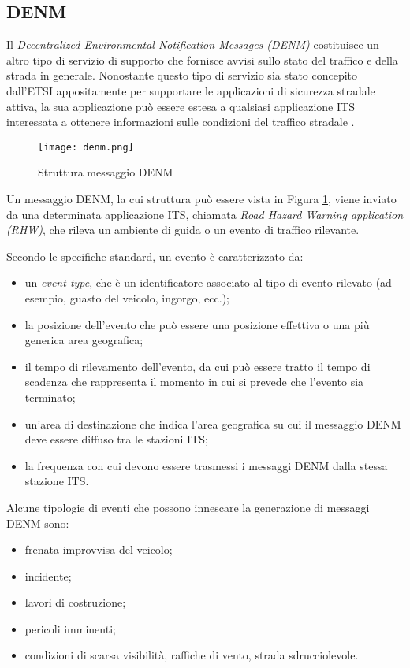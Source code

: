\subsection[DENM]{DENM}
Il \textit{Decentralized Environmental Notification Messages (DENM)} costituisce un altro tipo di servizio di supporto che fornisce avvisi sullo stato del traffico e della strada in generale. Nonostante questo tipo di servizio sia stato concepito dall'ETSI appositamente per supportare le applicazioni di sicurezza stradale attiva, la sua applicazione può essere estesa a qualsiasi applicazione ITS interessata a ottenere informazioni sulle condizioni del traffico stradale \cite{etsi2010etsi}.

\begin{figure}[h!]
    \centering
    \texttt{[image: denm.png]}
    \caption{Struttura messaggio DENM}
    \label{fig:denm}
\end{figure}

Un messaggio DENM, la cui struttura può essere vista in Figura \ref{fig:denm}, viene inviato da una determinata applicazione ITS, chiamata \textit{Road Hazard Warning application (RHW)}, che rileva un ambiente di guida o un evento di traffico rilevante.

Secondo le specifiche standard, un evento è caratterizzato da:
\begin{itemize}
    \item un \textit{event type}, che è un identificatore associato al tipo di evento rilevato (ad esempio, guasto del veicolo, ingorgo, ecc.); 
    \item la posizione dell'evento che può essere una posizione effettiva o una più generica area geografica; 
    \item il tempo di rilevamento dell'evento, da cui può essere tratto il tempo di scadenza che rappresenta il momento in cui si prevede che l'evento sia terminato;
    \item un'area di destinazione che indica l'area geografica su cui il messaggio DENM deve essere diffuso tra le stazioni ITS;
    \item la frequenza con cui devono essere trasmessi i messaggi DENM dalla stessa stazione ITS.
\end{itemize}

Alcune tipologie di eventi che possono innescare la generazione di messaggi DENM sono:

\begin{itemize}
    \item frenata improvvisa del veicolo;
    \item incidente;
    \item lavori di costruzione;
    \item pericoli imminenti;
    \item condizioni di scarsa visibilità, raffiche di vento, strada sdrucciolevole.
\end{itemize}

